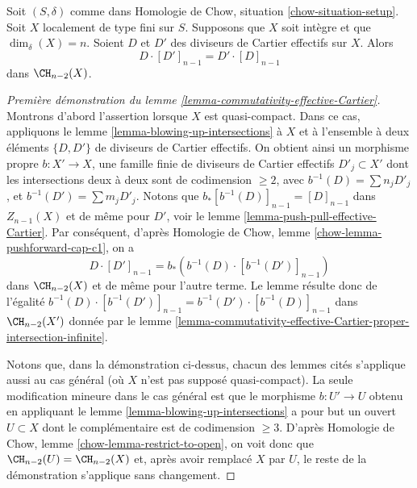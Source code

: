 \begin{lemma}
\label{lemma-commutativity-effective-Cartier}
Soit $(S, \delta)$ comme dans Homologie de Chow, situation \ref{chow-situation-setup}.
Soit $X$ localement de type fini sur $S$.
Supposons que $X$ soit intègre et que $\dim_\delta(X) = n$.
Soient $D$ et $D'$ des diviseurs de Cartier effectifs sur $X$.
Alors
$$
D \cdot [D']_{n - 1} = D' \cdot [D]_{n - 1}
$$
dans $\CH_{n - 2}(X)$.
\end{lemma}

\begin{proof}[Première démonstration du lemme \ref{lemma-commutativity-effective-Cartier}]
Montrons d'abord l'assertion lorsque $X$ est quasi-compact.
Dans ce cas, appliquons
le lemme \ref{lemma-blowing-up-intersections} à $X$ et à
l'ensemble à deux éléments $\{D, D'\}$ de diviseurs de Cartier effectifs.
On obtient ainsi un morphisme propre $b : X' \to X$,
une famille finie de diviseurs de Cartier
effectifs $D'_j \subset X'$ dont les intersections deux à deux sont de codimension $\geq 2$,
avec $b^{-1}(D) = \sum n_j D'_j$, et $b^{-1}(D') = \sum m_j D'_j$.
Notons que $b_*[b^{-1}(D)]_{n - 1} = [D]_{n - 1}$ dans $Z_{n - 1}(X)$
et de même pour $D'$,
voir le lemme \ref{lemma-push-pull-effective-Cartier}.
Par conséquent, d'après Homologie de Chow, lemme \ref{chow-lemma-pushforward-cap-c1}, on a
$$
D \cdot [D']_{n - 1} = b_*\left(b^{-1}(D) \cdot [b^{-1}(D')]_{n - 1}\right)
$$
dans $\CH_{n - 2}(X)$ et de même pour l'autre terme. Le
lemme résulte donc de l'égalité
$b^{-1}(D) \cdot [b^{-1}(D')]_{n - 1} = b^{-1}(D') \cdot [b^{-1}(D)]_{n - 1}$
dans $\CH_{n - 2}(X')$ donnée par le lemme
\ref{lemma-commutativity-effective-Cartier-proper-intersection-infinite}.

\medskip\noindent
Notons que, dans la démonstration ci-dessus, chacun des lemmes cités s'applique aussi
au cas général (où $X$ n'est pas supposé quasi-compact). La
seule modification mineure dans le cas général est que le morphisme
$b : U' \to U$ obtenu en appliquant
le lemme \ref{lemma-blowing-up-intersections}
a pour but
un ouvert $U \subset X$ dont le complémentaire est de codimension $\geq 3$.
D'après Homologie de Chow, lemme \ref{chow-lemma-restrict-to-open}, on voit donc que
$\CH_{n - 2}(U) = \CH_{n - 2}(X)$
et, après avoir remplacé $X$ par $U$, le reste de la démonstration s'applique
sans changement.
\end{proof}

